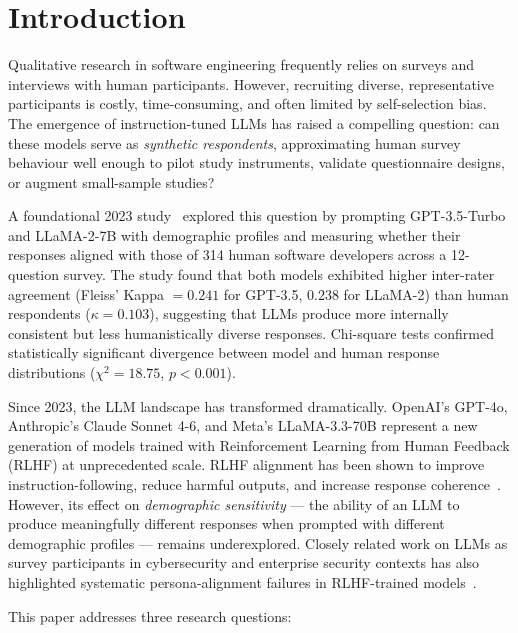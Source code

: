 \documentclass[11pt,a4paper]{article}
\begin{document}
\newpage
\tableofcontents
\newpage

\section{Introduction}
\label{sec:intro}

Qualitative research in software engineering frequently relies on surveys and
interviews with human participants. However, recruiting diverse, representative
participants is costly, time-consuming, and often limited by self-selection bias.
The emergence of instruction-tuned LLMs has raised a compelling question: can
these models serve as \emph{synthetic respondents}, approximating human survey
behaviour well enough to pilot study instruments, validate questionnaire designs,
or augment small-sample studies?

A foundational 2023 study~\citep{original2023} explored this question by
prompting GPT-3.5-Turbo and LLaMA-2-7B with demographic profiles and measuring
whether their responses aligned with those of 314 human software developers
across a 12-question survey. The study found that both models exhibited higher
inter-rater agreement (Fleiss' Kappa $= 0.241$ for GPT-3.5, $0.238$ for
LLaMA-2) than human respondents ($\kappa = 0.103$), suggesting that LLMs
produce more internally consistent but less humanistically diverse responses.
Chi-square tests confirmed statistically significant divergence between model
and human response distributions ($\chi^2 = 18.75$, $p < 0.001$).

Since 2023, the LLM landscape has transformed dramatically. OpenAI's GPT-4o,
Anthropic's Claude Sonnet 4-6, and Meta's LLaMA-3.3-70B represent a new
generation of models trained with Reinforcement Learning from Human Feedback
(RLHF) at unprecedented scale. RLHF alignment has been shown to improve
instruction-following, reduce harmful outputs, and increase response
coherence~\citep{ouyang2022}. However, its effect on \emph{demographic
sensitivity} --- the ability of an LLM to produce meaningfully different
responses when prompted with different demographic profiles --- remains
underexplored. Closely related work on LLMs as survey participants in
cybersecurity and enterprise security contexts has also highlighted systematic
persona-alignment failures in RLHF-trained models~\citep{ssrn6829506}.

This paper addresses three research questions:
\end{document}
